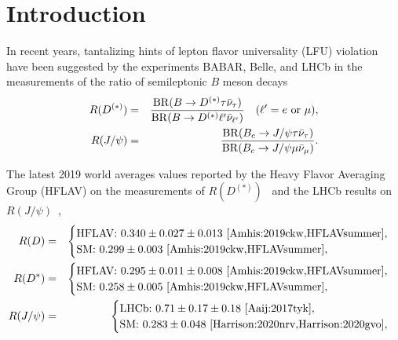 \documentclass[reprint,showpacs,aps,prd,nofootinbib,superscriptaddress,longbibliography]{revtex4-1}
\begin{document}
\maketitle

\section{Introduction}

In recent years, tantalizing hints of lepton flavor universality (LFU) violation have been suggested by the experiments BABAR, Belle, and LHCb in the measurements of the ratio of semileptonic $B$ meson decays~\cite{Lees:2012xj,Lees:2013uzd,Huschle:2015rga,Sato:2016svk,Hirose:2017vbz,Aaij:2015yra,Aaij:2017deq,
Aaij:2017uff,Belle:2019rba,Hirose:2017dxl,Hirose:2016wfn,Amhis:2019ckw,
HFLAVsummer,Aaij:2017tyk}
\begin{eqnarray}
R(D^{(\ast)}) &=& \dfrac{{\rm BR}(B \to D^{(\ast)}\tau \bar{\nu}_\tau)}{{\rm BR}(B \to D^{(\ast)}\ell^\prime \bar{\nu}_{\ell^\prime})}  \ \ \ (\ell^\prime = e \ {\rm or} \ \mu), \label{R_D} \\
R(J/\psi) &=&  \dfrac{{\rm BR}(B_c \to J/\psi \tau \bar{\nu}_\tau)}{{\rm BR}(B_c \to J/\psi\mu \bar{\nu}_{\mu})}. \label{R_Jpsi} 
\end{eqnarray} 

\noindent The latest 2019 world averages values reported by the Heavy Flavor Averaging Group (HFLAV) on the measurements of $R(D^{(\ast)})$~\cite{Amhis:2019ckw,HFLAVsummer} and the LHCb results on $R(J/\psi)$~\cite{Aaij:2017tyk,Harrison:2020nrv,Harrison:2020gvo},
\begin{eqnarray}
R(D) &=&
\begin{cases}
\text{HFLAV:} \ 0.340 \pm 0.027 \pm 0.013\text{~\cite{Amhis:2019ckw,HFLAVsummer}}, \\
\text{SM:} \ 0.299 \pm 0.003\text{~\cite{Amhis:2019ckw,HFLAVsummer}},
\end{cases} \\
R(D^\ast) &=&
\begin{cases}
\text{HFLAV:} \ 0.295 \pm 0.011 \pm 0.008\text{~\cite{Amhis:2019ckw,HFLAVsummer}}, \\
\text{SM:} \ 0.258 \pm 0.005\text{~\cite{Amhis:2019ckw,HFLAVsummer}},
\end{cases} \\
R(J/\psi) &=& \begin{cases}
\text{LHCb:} \ 0.71 \pm 0.17 \pm 0.18\text{~\cite{Aaij:2017tyk}}, \\
\text{SM:} \ 0.283 \pm 0.048\text{~\cite{Harrison:2020nrv,Harrison:2020gvo}},
\end{cases} 
\end{eqnarray}
\end{document}
